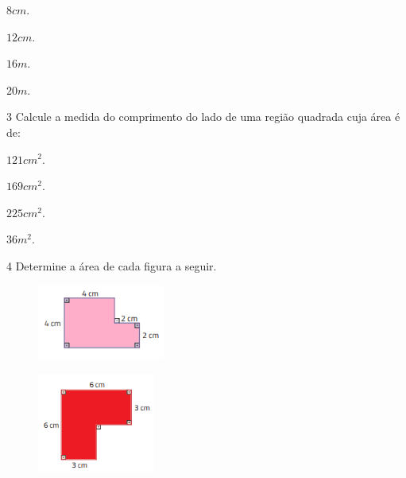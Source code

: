 {{{{\begin{escolha}[itemsep=0pt]
\item $8 cm$.

\item $12 cm$.

\item $16 m$.

\item $20 m$.

\end{escolha}


\num{3} Calcule a medida do comprimento do lado de uma região quadrada cuja
área é de:

\begin{escolha}[itemsep=0pt]
\item $121 cm^2$.
    
\item $169 cm^2$.

\item $225 cm^2$.

\item $36 m^2$.

\end{escolha}


\num{4} Determine a área de cada figura a seguir.


\begin{escolha}[itemsep=0pt]
\item
\begin{figure}[H]
\centering\includegraphics[width=1.65in,height=0.96458in]{./imgSAEB_8_MAT/media/image43.png}
\end{figure}


\item
\begin{figure}[H]
\centering\includegraphics[width=1.50833in,height=1.28681in]{./imgSAEB_8_MAT/media/image44.png}
\end{figure}


\end{escolha}}}}}
